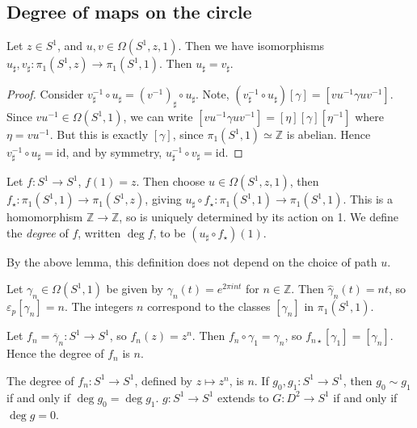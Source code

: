 \subsection{Degree of maps on the circle}
\begin{lemma}
	Let \( z \in S^1 \), and \( u, v \in \Omega(S^1, z, 1) \).
	Then we have isomorphisms \( u_\sharp, v_\sharp \colon \pi_1(S^1, z) \to \pi_1(S^1, 1) \).
	Then \( u_\sharp = v_\sharp \).
\end{lemma}
\begin{proof}
	Consider \( v_\sharp^{-1} \circ u_\sharp = (v^{-1})_\sharp \circ u_\sharp \).
	Note, \( (v_\sharp^{-1} \circ u_\sharp)[\gamma] = [vu^{-1}\gamma uv^{-1}] \).
	Since \( vu^{-1} \in \Omega(S^1, 1) \), we can write \( [vu^{-1}\gamma uv^{-1}] = [\eta][\gamma][\eta^{-1}] \) where \( \eta = vu^{-1} \).
	But this is exactly \( [\gamma] \), since \( \pi_1(S^1,1) \simeq \mathbb Z \) is abelian.
	Hence \( v_\sharp^{-1} \circ u_\sharp = \mathrm{id} \), and by symmetry, \( u_\sharp^{-1} \circ v_\sharp = \mathrm{id} \).
\end{proof}
\begin{definition}
	Let \( f \colon S^1 \to S^1 \), \( f(1) = z \).
	Then choose \( u \in \Omega(S^1, z, 1) \), then \( f_\star \colon \pi_1(S^1,1) \to \pi_1(S^1,z) \), giving \( u_\sharp \circ f_\star \colon \pi_1(S^1, 1) \to \pi_1(S^1, 1) \).
	This is	a homomorphism \( \mathbb Z \to \mathbb Z \), so is uniquely determined by its action on 1.
	We define the \emph{degree} of \( f \), written \( \deg f \), to be \( (u_\sharp \circ f_\star)(1) \).
\end{definition}
By the above lemma, this definition does not depend on the choice of path \( u \).
\begin{example}
	Let \( \gamma_n \in \Omega(S^1,1) \) be given by \( \gamma_n(t) = e^{2\pi i n t} \) for \( n \in \mathbb Z \).
	Then \( \hat \gamma_n(t) = n t \), so \( \varepsilon_p[\gamma_n] = n \).
	The integers \( n \) correspond to the classes \( [\gamma_n] \) in \( \pi_1(S^1,1) \).

	Let \( f_n = \overline \gamma_n \colon S^1 \to S^1 \), so \( f_n(z) = z^n \).
	Then \( f_n \circ \gamma_1 = \gamma_n \), so \( f_{n\star}[\gamma_1] = [\gamma_n] \).
	Hence the degree of \( f_n \) is \( n \).
\end{example}
\begin{proposition}
	The degree of \( f_n : S^1 \to S^1 \), defined by \( z \mapsto z^n \), is \( n \).
	If \( g_0, g_1 \colon S^1 \to S^1 \), then \( g_0 \sim g_1 \) if and only if \( \deg g_0 = \deg g_1 \).
	\( g \colon S^1 \to S^1 \) extends to \( G \colon D^2 \to S^1 \) if and only if \( \deg g = 0 \).
\end{proposition}
